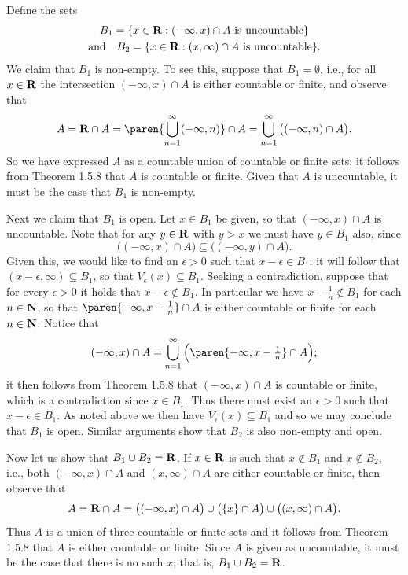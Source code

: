 \documentclass{lew98_solutions}
\begin{document}
\begin{solution}
    Define the sets
    \begin{multline*}
        B_1 = \{ x \in \mathbf{R} : (-\infty, x) \cap A \text{ is uncountable} \} \\
        \text{and} \quad B_2 = \{ x \in \mathbf{R} : (x, \infty) \cap A \text{ is uncountable} \}.
    \end{multline*}
    We claim that \( B_1 \) is non-empty. To see this, suppose that \( B_1 = \emptyset \), i.e., for all \( x \in \mathbf{R} \) the intersection \( (-\infty, x) \cap A \) is either countable or finite, and observe that
    \[
        A = \R \cap A = \paren{ \bigcup_{n=1}^{\infty} (-\infty, n) } \cap A = \bigcup_{n=1}^{\infty} \big( (-\infty, n) \cap A \big).
    \]
    So we have expressed \( A \) as a countable union of countable or finite sets; it follows from Theorem 1.5.8 that \( A \) is countable or finite. Given that \( A \) is uncountable, it must be the case that \( B_1 \) is non-empty.

    Next we claim that \( B_1 \) is open. Let \( x \in B_1 \) be given, so that \( (-\infty, x) \cap A \) is uncountable. Note that for any \( y \in \mathbf{R} \) with \( y > x \) we must have \( y \in B_1 \) also, since
    \[
        \big( (-\infty, x) \cap A \big) \subseteq \big( (-\infty, y) \cap A \big).
    \]
    Given this, we would like to find an \( \epsilon > 0 \) such that \( x - \epsilon \in B_1 \); it will follow that \( (x - \epsilon, \infty) \subseteq B_1 \), so that \( V_{\epsilon}(x) \subseteq B_1 \). Seeking a contradiction, suppose that for every \( \epsilon > 0 \) it holds that \( x - \epsilon \not\in B_1 \). In particular we have \( x - \tfrac{1}{n} \not\in B_1 \) for each \( n \in \mathbf{N} \), so that \( \paren{ -\infty, x - \tfrac{1}{n} } \cap A \) is either countable or finite for each \( n \in \mathbf{N} \). Notice that
    \[
        (-\infty, x) \cap A = \bigcup_{n=1}^{\infty} \Big( \paren{ -\infty, x - \tfrac{1}{n} } \cap A \Big);
    \]
    it then follows from Theorem 1.5.8 that \( (-\infty, x) \cap A \) is countable or finite, which is a contradiction since \( x \in B_1 \). Thus there must exist an \( \epsilon > 0 \) such that \( x - \epsilon \in B_1 \). As noted above we then have \( V_{\epsilon}(x) \subseteq B_1 \) and so we may conclude that \( B_1 \) is open. Similar arguments show that \( B_2 \) is also non-empty and open.

    Now let us show that \( B_1 \cup B_2 = \mathbf{R} \). If \( x \in \mathbf{R} \) is such that \( x \not\in B_1 \) and \( x \not\in B_2 \), i.e., both \( (-\infty, x) \cap A \) and \( (x, \infty) \cap A \) are either countable or finite, then observe that
    \[
        A = \mathbf{R} \cap A = \big( (-\infty, x) \cap A \big) \cup \big( \{ x \} \cap A \big) \cup \big( (x, \infty) \cap A \big).
    \]
    Thus \( A \) is a union of three countable or finite sets and it follows from Theorem 1.5.8 that \( A \) is either countable or finite. Since \( A \) is given as uncountable, it must be the case that there is no such \( x \); that is, \( B_1 \cup B_2 = \mathbf{R} \).


\end{solution}
\end{document}
